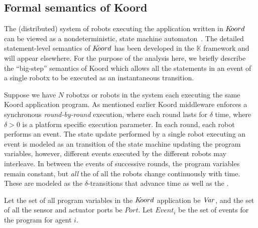 
\subsection{Formal semantics of Koord}
\label{sec:semantics}

The (distributed) system of robots  executing the \dmap application written in $K\kern-2pt oord$ can be viewed as a nondeterministic, state machine automaton~\cite{TIOAmon, Mitra07PhD}. The detailed statement-level semantics of $K\kern-2pt oord$ has been developed in the $\mathbb{K}$ framework and will appear elsewhere. For the purpose of the analysis here, we briefly describe the ``big-step'' semantics of Koord which allows all the statements in an event of a single robotx to be executed as an instantaneous transition.

Suppose we have $N$ robotxs or robots in the system each executing the same Koord application program. As mentioned earlier Koord middleware enforces a synchronous  \emph{round-by-round} execution, where each round lasts for $\delta$ time, where $\delta >0$ is a platform specific execution parameter.
%
In each round, each robot performs an  event.
The state update performed by a single robot executing an  event is modeled as an  transition of the state machine updating the program variables, however,  different events executed by the different robots may interleave. In between the events of successive rounds, the program variables remain constant, but {\em all\/} the  of all the robots  change continuously with time.  These are modeled as the $\delta$-transitions that advance time as well as the .

%
Let the set of all program variables in the $K\kern-2pt oord$ application be $\mathit{Var}$, and the set of all the sensor and actuator ports be $\mathit{Port}$. Let $\mathit{Event}_i$ be the set of events for the program for agent $i$.

